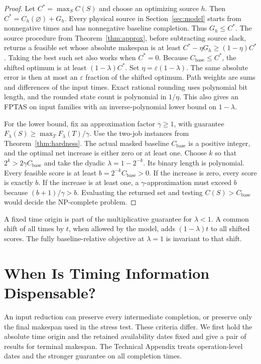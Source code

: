 \documentclass[11pt,letterpaper]{article}
\begin{document}
\begin{proof}
Let $C^*=\max_S C(S)$ and choose an optimizing source $h$. Then $C^*=C_h(\varnothing)+G_h$. Every physical source in Section~\ref{sec:model} starts from nonnegative times and has nonnegative baseline completion. Thus $G_h\le C^*$. The source procedure from Theorem~\ref{thm:approx}, before subtracting source slack, returns a feasible set whose absolute makespan is at least $C^*-\eta G_h\ge(1-\eta)C^*$. Taking the best such set also works when $C^*=0$. Because $C_{\mathrm{base}}\le C^*$, the shifted optimum is at least $(1-\lambda)C^*$. Set $\eta=\varepsilon(1-\lambda)$. The same absolute error is then at most an $\varepsilon$ fraction of the shifted optimum. Path weights are sums and differences of the input times. Exact rational rounding uses polynomial bit length, and the rounded state count is polynomial in $1/\eta$. This also gives an FPTAS on input families with an inverse-polynomial lower bound on $1-\lambda$.

For the lower bound, fix an approximation factor $\gamma\ge 1$, with guarantee $F_\lambda(S)\ge\max_T F_\lambda(T)/\gamma$. Use the two-job instances from Theorem~\ref{thm:hardness}. The actual masked baseline $C_{\mathrm{base}}$ is a positive integer, and the optimal net increase is either zero or at least one. Choose $k$ so that $2^k>2\gamma C_{\mathrm{base}}$ and take the dyadic $\lambda=1-2^{-k}$. Its binary length is polynomial. Every feasible score is at least $b=2^{-k}C_{\mathrm{base}}>0$. If the increase is zero, every score is exactly $b$. If the increase is at least one, a $\gamma$-approximation must exceed $b$ because $(b+1)/\gamma>b$. Evaluating the returned set and testing $C(S)>C_{\mathrm{base}}$ would decide the NP-complete problem.
\end{proof}

A fixed time origin is part of the multiplicative guarantee for $\lambda<1$. A common shift of all times by $t$, when allowed by the model, adds $(1-\lambda)t$ to all shifted scores. The fully baseline-relative objective at $\lambda=1$ is invariant to that shift.

\section{When Is Timing Information Dispensable?}
\label{sec:deletion}

An input reduction can preserve every intermediate completion, or preserve only the final makespan used in the stress test. These criteria differ. We first hold the absolute time origin and the retained availability dates fixed and give a pair of results for terminal makespan. The Technical Appendix treats operation-level dates and the stronger guarantee on all completion times.
\end{document}
